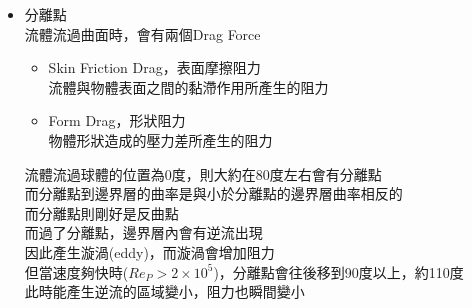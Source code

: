 \documentclass[../main.tex]{subfiles}
\begin{document}
\begin{itemize}
\begin{itemize}
    當顆粒濃度高時，因為顆粒與顆粒之間距離太近\\
    顆粒沉降過程，會受到其他顆粒影響，而這種影響為負面的\\
    因此通常受阻沉降的速度會比自由沉降來得慢
  \end{itemize}
  \item 分離點\\
  流體流過曲面時，會有兩個Drag Force
  \begin{itemize}
    \item Skin Friction Drag，表面摩擦阻力\\
    流體與物體表面之間的黏滯作用所產生的阻力
    \item Form Drag，形狀阻力\\
    物體形狀造成的壓力差所產生的阻力
  \end{itemize}
  流體流過球體的位置為0度，則大約在80度左右會有分離點\\
  而分離點到邊界層的曲率是與小於分離點的邊界層曲率相反的\\
  而分離點則剛好是反曲點\\
  而過了分離點，邊界層內會有逆流出現\\
  因此產生漩渦(eddy)，而漩渦會增加阻力\\
  但當速度夠快時($Re_P > 2\times 10^5$)，分離點會往後移到90度以上，約110度\\
  此時能產生逆流的區域變小，阻力也瞬間變小
\end{itemize}
\end{document}
